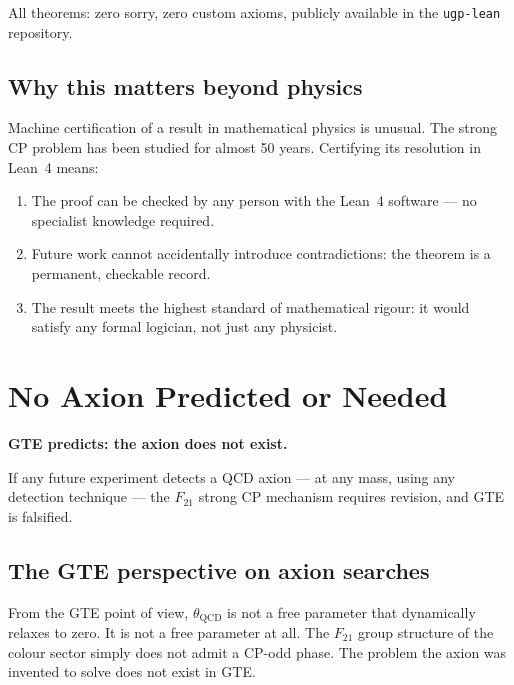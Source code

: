 \documentclass[11pt,a4paper]{article}
\begin{document}
\medskip
All theorems: zero sorry, zero custom axioms, publicly available in the \texttt{ugp-lean} repository.

\subsection{Why this matters beyond physics}

Machine certification of a result in mathematical physics is unusual.  The strong CP problem has been studied for almost 50 years.  Certifying its resolution in Lean~4 means:
\begin{enumerate}
  \item The proof can be checked by any person with the Lean~4 software --- no specialist knowledge required.
  \item Future work cannot accidentally introduce contradictions: the theorem is a permanent, checkable record.
  \item The result meets the highest standard of mathematical rigour: it would satisfy any formal logician, not just any physicist.
\end{enumerate}

\section{No Axion Predicted or Needed}

\begin{tcolorbox}[colback=boxorange,colframe=orange!60!black,title=A falsifiable prediction]
\textbf{GTE predicts: the axion does not exist.}

If any future experiment detects a QCD axion --- at any mass, using any detection technique --- the $F_{21}$ strong CP mechanism requires revision, and GTE is falsified.
\end{tcolorbox}

\subsection{The GTE perspective on axion searches}

From the GTE point of view, $\theta_{\mathrm{QCD}}$ is not a free parameter that dynamically relaxes to zero.  It is not a free parameter at all.  The $F_{21}$ group structure of the colour sector simply does not admit a CP-odd phase.  The problem the axion was invented to solve does not exist in GTE.
\end{document}
